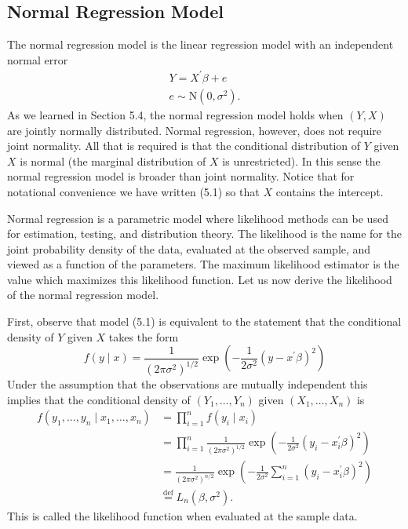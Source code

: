 \documentclass[10pt]{article}
\begin{document}
\subsection{Normal Regression Model}
The normal regression model is the linear regression model with an independent normal error
$$
\begin{gathered}
Y=X^{\prime} \beta+e \\
e \sim \mathrm{N}\left(0, \sigma^{2}\right) .
\end{gathered}
$$
As we learned in Section 5.4, the normal regression model holds when $(Y, X)$ are jointly normally distributed. Normal regression, however, does not require joint normality. All that is required is that the conditional distribution of $Y$ given $X$ is normal (the marginal distribution of $X$ is unrestricted). In this sense the normal regression model is broader than joint normality. Notice that for notational convenience we have written (5.1) so that $X$ contains the intercept.

Normal regression is a parametric model where likelihood methods can be used for estimation, testing, and distribution theory. The likelihood is the name for the joint probability density of the data, evaluated at the observed sample, and viewed as a function of the parameters. The maximum likelihood estimator is the value which maximizes this likelihood function. Let us now derive the likelihood of the normal regression model.

First, observe that model (5.1) is equivalent to the statement that the conditional density of $Y$ given $X$ takes the form
$$
f(y \mid x)=\frac{1}{\left(2 \pi \sigma^{2}\right)^{1 / 2}} \exp \left(-\frac{1}{2 \sigma^{2}}\left(y-x^{\prime} \beta\right)^{2}\right)
$$
Under the assumption that the observations are mutually independent this implies that the conditional density of $\left(Y_{1}, \ldots, Y_{n}\right)$ given $\left(X_{1}, \ldots, X_{n}\right)$ is
$$
\begin{aligned}
f\left(y_{1}, \ldots, y_{n} \mid x_{1}, \ldots, x_{n}\right) &=\prod_{i=1}^{n} f\left(y_{i} \mid x_{i}\right) \\
&=\prod_{i=1}^{n} \frac{1}{\left(2 \pi \sigma^{2}\right)^{1 / 2}} \exp \left(-\frac{1}{2 \sigma^{2}}\left(y_{i}-x_{i}^{\prime} \beta\right)^{2}\right) \\
&=\frac{1}{\left(2 \pi \sigma^{2}\right)^{n / 2}} \exp \left(-\frac{1}{2 \sigma^{2}} \sum_{i=1}^{n}\left(y_{i}-x_{i}^{\prime} \beta\right)^{2}\right) \\
& \stackrel{\operatorname{def}}{=} L_{n}\left(\beta, \sigma^{2}\right) .
\end{aligned}
$$
This is called the likelihood function when evaluated at the sample data.
\end{document}
